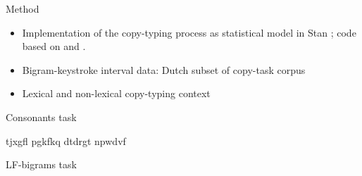 \begin{frame}{Method}

\begin{itemize}
	\item Implementation of the copy-typing process as statistical model in Stan \parencite{carpenter2016stan}; code based on \textcite{sorensen2016bayesian} and \textcite{vasishth2017}.
	\item Bigram-keystroke interval data: Dutch subset of copy-task corpus \parencite{waes2019,van2019multilingual}
	\item Lexical and non-lexical copy-typing context
\end{itemize}

\end{frame}


\begin{frame}{Consonants task}	
	\begin{center}
		\begin{large}
			tjxgfl pgkfkq dtdrgt npwdvf
		\end{large}
	\end{center}
\end{frame}

\begin{frame}{LF-bigrams task}	
	\begin{center}
	
	\end{center}
\end{frame}


